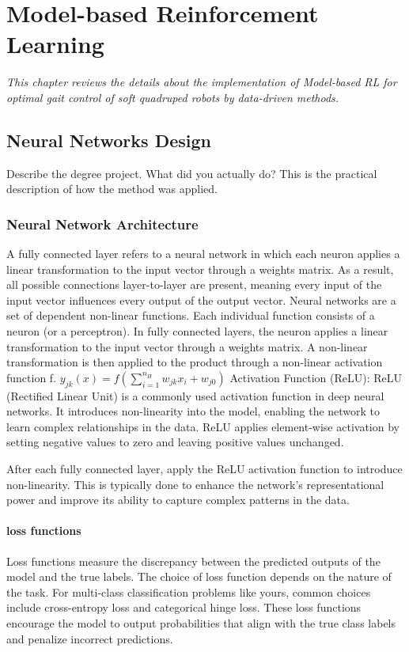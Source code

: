 \chapter{Model-based Reinforcement Learning}
\label{chap4}
\textit{This chapter reviews the details about the implementation of Model-based \ac{RL} for optimal gait control of soft quadruped robots by data-driven methods.}
\section{Neural Networks Design}
Describe the degree project. What did you actually do? This is the practical description of how the method was applied. 
\subsection{Neural Network Architecture}
A fully connected layer refers to a neural network in which each neuron applies a linear transformation to the input vector through a weights matrix. As a result, all possible connections layer-to-layer are present, meaning every input of the input vector influences every output of the output vector. Neural networks are a set of dependent non-linear functions. Each individual function consists of a neuron (or a perceptron). In fully connected layers, the neuron applies a linear transformation to the input vector through a weights matrix. A non-linear transformation is then applied to the product through a non-linear activation function f. $y_{j k}(x)=f\left(\sum_{i=1}^{n_H} w_{j k} x_i+w_{j 0}\right)$
Activation Function (ReLU): ReLU (Rectified Linear Unit) is a commonly used activation function in deep neural networks. It introduces non-linearity into the model, enabling the network to learn complex relationships in the data. ReLU applies element-wise activation by setting negative values to zero and leaving positive values unchanged.

After each fully connected layer, apply the ReLU activation function to introduce non-linearity. This is typically done to enhance the network's representational power and improve its ability to capture complex patterns in the data.


\subsubsection{loss functions}
Loss functions measure the discrepancy between the predicted outputs of the model and the true labels. The choice of loss function depends on the nature of the task. For multi-class classification problems like yours, common choices include cross-entropy loss and categorical hinge loss. These loss functions encourage the model to output probabilities that align with the true class labels and penalize incorrect predictions.

